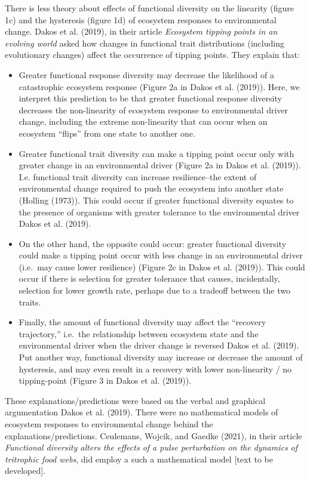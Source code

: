 \documentclass{article}
\begin{document}
There is less theory about effects of functional diversity on the
linearity (figure 1c) and the hysteresis (figure 1d) of ecosystem
responses to environmental change. Dakos et al. (2019), in their article
\emph{Ecosystem tipping points in an evolving world} asked how changes
in functional trait distributions (including evolutionary changes)
affect the occurrence of tipping points. They explain that:

\begin{itemize}
\item
  Greater functional response diversity may decrease the likelihood of a
  catastrophic ecosystem response (Figure 2a in Dakos et al. (2019)).
  Here, we interpret this prediction to be that greater functional
  response diversity decreases the non-linearity of ecosystem response
  to environmental driver change, including the extreme non-linearity
  that can occur when an ecosystem ``flips'' from one state to another
  one.
\item
  Greater functional trait diversity can make a tipping point occur only
  with greater change in an environmental driver (Figure 2a in Dakos et
  al. (2019)). I.e. functional trait diversity can increase
  resilience--the extent of environmental change required to push the
  ecosystem into another state (Holling (1973)). This could occur if
  greater functional diversity equates to the presence of organisms with
  greater tolerance to the environmental driver Dakos et al. (2019).
\item
  On the other hand, the opposite could occur: greater functional
  diversity could make a tipping point occur with less change in an
  environmental driver (i.e.~may cause lower resilience) (Figure 2c in
  Dakos et al. (2019)). This could occur if there is selection for
  greater tolerance that causes, incidentally, selection for lower
  growth rate, perhaps due to a tradeoff between the two traits.
\item
  Finally, the amount of functional diversity may affect the ``recovery
  trajectory,'' i.e.~the relationship between ecosystem state and the
  environmental driver when the driver change is reversed Dakos et al.
  (2019). Put another way, functional diversity may increase or decrease
  the amount of hysteresis, and may even result in a recovery with lower
  non-linearity / no tipping-point (Figure 3 in Dakos et al. (2019)).
\end{itemize}

These explanations/predictions were based on the verbal and graphical
argumentation Dakos et al. (2019). There were no mathematical models of
ecosystem responses to environmental change behind the
explanations/predictions. Ceulemans, Wojcik, and Gaedke (2021), in their
article \emph{Functional diversity alters the effects of a pulse
perturbation on the dynamics of tritrophic food webs}, did employ a such
a mathematical model {[}text to be developed{]}.
\end{document}
